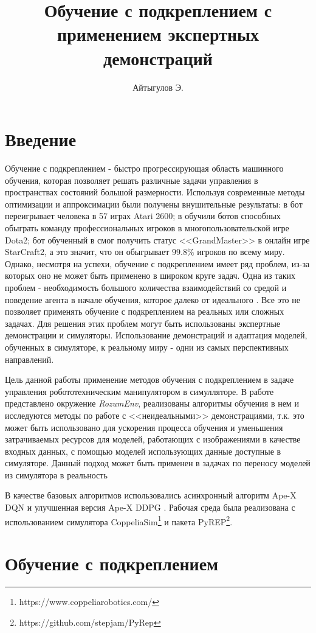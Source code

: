 \documentclass{mipt-thesis-bs}
\title{Обучение с подкреплением с применением экспертных демонстраций}
\author{Айтыгулов Э.}
\begin{document}
\frontmatter
\titlecontents

\chapter{Введение}
Обучение с подкреплением - быстро прогрессирующая область машинного обучения, которая позволяет решать различные задачи управления в пространствах состояний большой размерности. Используя современные методы оптимизации и аппроксимации были получены внушительные результаты: в \cite{Agent-57} бот переигрывает человека в 57 играх Atari 2600; в \cite{OpenAI} обучили ботов способных обыграть команду профессиональных игроков в многопользовательской игре Dota2; бот обученный в \cite{DeepMind} смог получить статус <<GrandMaster>> в онлайн игре StarCraft2, а это значит, что он обыгрывает $99.8\%$ игроков по всему миру. Однако, несмотря на успехи, обучение с подкреплением имеет ряд проблем, из-за которых оно не может быть применено в широком круге задач. Одна из таких проблем - необходимость большого количества взаимодействий со средой и поведение агента в начале обучения, которое далеко от идеального . Все это не позволяет применять обучение с подкреплением на реальных или сложных задачах. Для решения этих проблем могут быть использованы экспертные демонстрации и симуляторы. Использование демонстраций и адаптация моделей, обученных в симуляторе, к реальному миру - одни из самых перспективных направлений.

Цель данной работы применение методов обучения с подкреплением в задаче управления робототехническим манипулятором в симулляторе. В работе представлено окружение \textit{RozumEnv}, реализованы алгоритмы обучения в нем и исследуются методы по работе с <<неидеальными>> демонстрациями, т.к. это может быть использовано для ускорения процесса обучения и уменьшения затрачиваемых ресурсов для моделей, работающих с изображениями в качестве входных данных, с помощью моделей использующих данные доступные в симуляторе. 
Данный подход может быть применен в задачах по переносу моделей из симулятора в реальность

В качестве базовых алгоритмов использовались асинхронный алгоритм Ape-X DQN и улучшенная версия Ape-X DDPG  \cite{apex}. Рабочая среда была реализована с использованием симулятора CoppeliaSim\footnote{https://www.coppeliarobotics.com/} и пакета PyREP\footnote{https://github.com/stepjam/PyRep}.

\mainmatter
\chapter{Обучение с подкреплением}
\end{document}
